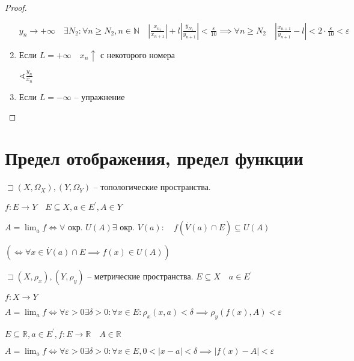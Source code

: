 \documentclass{book}
\newcommand\N{\ensuremath{\mathbb{N}}}
\newcommand\R{\ensuremath{\mathbb{R}}}
\newcommand{\p}[1]{#1^{\prime}}
\theoremstyle{definition}
\begin{document}
\begin{proof}
\begin{enumerate}
            $y_{n} \to +\infty \quad \exists N_2:\forall n\geqslant N_2, n\in \N \quad \left| \frac{x_{n_1}}{x_{n+1}} \right| + l\left| \frac{y_{N_1}}{y_{n+1}} \right| <\frac{\varepsilon}{10} \implies \forall n\geqslant N_2\quad \left| \frac{x_{n+1}}{y_{n+1}} - l \right|<2\cdot \frac{\varepsilon}{10} <\varepsilon $ 

           \item Если $L = +\infty \quad x_{n} \uparrow$ с некоторого номера

               $\sphericalangle \frac{y_{n} }{x_{n} }$ 

           \item Если $L = -\infty $ -- упражнение
    \end{enumerate}
\end{proof}


\section{Предел отображения, предел функции}

\begin{definition}
    $\sqsupset (X, \Omega_X), (Y, \Omega_Y)$ -- топологические пространства.

    $f:E\to Y\quad E\subseteq X, a\in \p E, A\in Y$

    $A = \lim_a f \iff \forall $ окр. $U(A) \exists $ окр. $V(a):\quad f\left( \overset{\cdot }V(a)\cap E \right) \subseteq U(A)$

    $\left( \iff  \forall x\in \overset{\cdot }V(a)\cap E \implies f(x)\in U(A) \right) $
\end{definition}

\begin{definition}
    [по Коши]

    $\sqsupset  (X, \rho_x), (Y, \rho_y)$ -- метрические пространства. $E\subseteq X\quad a\in \p E$

    $f:X\to Y$

    $A = \lim_a f \iff \forall \varepsilon>0\exists \delta >0:\forall x\in E: \rho_x(x, a)<\delta \implies \rho_y(f(x), A)<\varepsilon$
\end{definition}
\begin{definition}

    $E\subseteq \R, a\in \p E, f:E\to \R\quad A\in \R$

    $A = \lim_af \iff \forall \varepsilon>0\exists \delta >0: \forall x\in E, 0<|x-a|<\delta \implies \left| f(x)-A \right| <\varepsilon$
\end{definition}
\end{document}
